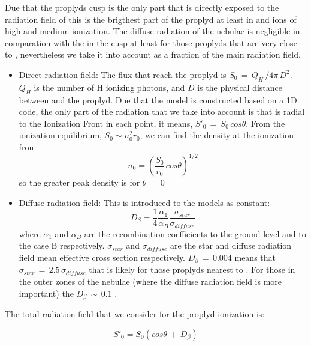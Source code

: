 \documentclass[useAMS,usenatbib]{mn2e}
\begin{document}
Due that the proplyds cusp is the only part that is directly exposed to the radiation field of \tc this is the brigthest part of the proplyd at least in \ha and ions of high and medium ionization. The diffuse radiation of the nebulae is negligible in comparation with the \tc in the cusp at least for those proplyds that are very close to \tc, nevertheless we take it into account as a fraction of the main radiation field.

\begin{itemize}
\item{Direct radiation field: The \tc flux that reach the proplyd is $S_0 \, = \, Q_H \, / 4\pi \, D^2$. $Q_H$ is the number of H ionizing photons, and $D$ is the physical distance between \tc and the proplyd. Due that the model is constructed based on  a 1D code, the only part of the radiation that we take into account is that is radial to the Ionization Front in each point, it means, $S'_0 \, = \, S_0 \, cos \theta$. From the ionization equilibrium, $S_0 \sim n_0^2 r_0$, we can find the density at the ionization fron
    \begin{equation}
      n_0 = \left( \frac{S_0}{r_0} \, cos \theta \right) ^{1/2}
    \end{equation}
}
so the greater peak density is for $\theta \, = \, 0$
\item{Diffuse radiation field: This is introduced to the models as constant:
    \begin{equation}
      D_\beta = \frac{1}{4} \frac{\alpha_1}{\alpha_B} \frac{\sigma_{star}}{\sigma_{diffuse}}
    \end{equation}
    where $\alpha_1$ and $\alpha_B$ are the recombination coefficients to the ground level and to the case B respectively.  $\sigma_{star}$ and $\sigma_{diffuse}$ are the star and diffuse radiation field mean effective cross section respectively. $D_\beta \, = \, 0.004$ means that $\sigma_{star} \, = \, 2.5 \, \sigma_{diffuse}$ that is likely for those proplyds nearest to \tc. For those in the outer zones of the nebulae (where the diffuse radiation field is more important) the $D_\beta \, \sim \, 0.1$ \citep{1999AJ....118.2350H}.
}
\end{itemize}

The total radiation field that we consider for the proplyd ionization is: 

\begin{equation}
  S'_0 = S_0 (cos \theta \, + \, D_\beta)
\end{equation}
\end{document}
